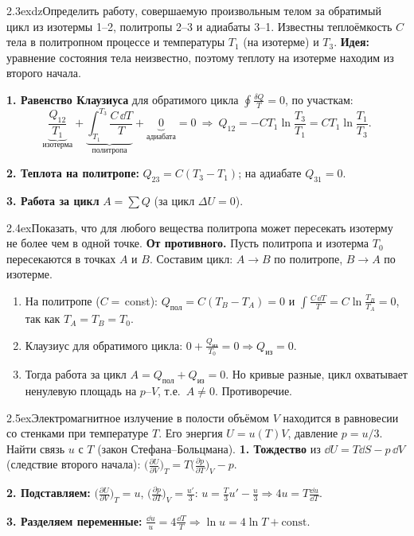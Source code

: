 \begin{problem}{2.3}{exdz}{Определить работу, совершаемую произвольным телом за обратимый цикл из изотермы 1--2, политропы 2--3 и адиабаты 3--1.
Известны теплоёмкость $C$ тела в политропном процессе и температуры $T_1$ (на изотерме) и $T_3$.}
\textbf{Идея:} уравнение состояния тела неизвестно, поэтому теплоту на изотерме находим из второго начала.

\textbf{1. Равенство Клаузиуса} для обратимого цикла $\oint\frac{\delta Q}{T}=0$, по участкам:
\[\underbrace{\frac{Q_{12}}{T_1}}_{\text{изотерма}}+\underbrace{\int_{T_1}^{T_3}\frac{C\,\dd T}{T}}_{\text{политропа}}+\underbrace{0}_{\text{адиабата}}=0
\ \Rightarrow\ Q_{12}=-CT_1\ln\frac{T_3}{T_1}=CT_1\ln\frac{T_1}{T_3}.\]

\textbf{2. Теплота на политропе:} $Q_{23}=C(T_3-T_1)$; на адиабате $Q_{31}=0$.

\textbf{3. Работа за цикл} $A=\sum Q$ (за цикл $\Delta U=0$).
\end{problem}

\begin{problem}{2.4}{ex}{Показать, что для любого вещества политропа может пересекать изотерму не более чем в одной точке.}
\textbf{От противного.} Пусть политропа и изотерма $T_0$ пересекаются в точках $A$ и $B$. Составим цикл: $A\to B$ по политропе, $B\to A$ по изотерме.
\begin{enumerate}
\item На политропе ($C=$\,const): $Q_{\text{пол}}=C(T_B-T_A)=0$ и $\int\frac{C\,\dd T}{T}=C\ln\frac{T_B}{T_A}=0$, так как $T_A=T_B=T_0$.
\item Клаузиус для обратимого цикла: $0+\frac{Q_{\text{из}}}{T_0}=0\Rightarrow Q_{\text{из}}=0$.
\item Тогда работа за цикл $A=Q_{\text{пол}}+Q_{\text{из}}=0$. Но кривые разные, цикл охватывает ненулевую площадь на $p$--$V$, т.е.\ $A\ne0$. Противоречие.
\end{enumerate}
\end{problem}

\begin{problem}{2.5}{ex}{Электромагнитное излучение в полости объёмом $V$ находится в равновесии со стенками при температуре $T$.
Его энергия $U=u(T)V$, давление $p=u/3$. Найти связь $u$ с $T$ (закон Стефана–Больцмана).}
\textbf{1. Тождество} из $\dd U=T\dd S-p\,\dd V$ (следствие второго начала):
$\big(\frac{\partial U}{\partial V}\big)_T=T\big(\frac{\partial p}{\partial T}\big)_V-p$.

\textbf{2. Подставляем:} $\big(\frac{\partial U}{\partial V}\big)_T=u$, $\big(\frac{\partial p}{\partial T}\big)_V=\frac{u'}3$:
\quad $u=\frac T3u'-\frac u3\Rightarrow4u=T\frac{\dd u}{\dd T}$.

\textbf{3. Разделяем переменные:} $\frac{\dd u}{u}=4\frac{\dd T}{T}\Rightarrow\ln u=4\ln T+\text{const}$.
\end{problem}

